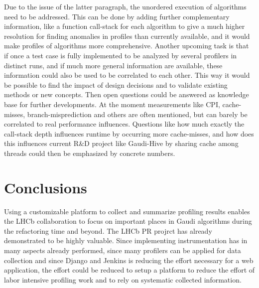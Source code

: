 \documentclass[a4paper]{jpconf}
\begin{document}
Due to the issue of the latter paragraph, the unordered execution of algorithms need to be addressed. This can be done by adding further complementary information, like a function call-stack for each algorithm to give a much higher resolution for finding anomalies in profiles than currently available, and it would make profiles of algorithms more comprehensive.
\newline
Another upcoming task is that if once a test case is fully implemented to be analyzed by several profilers in distinct runs, and if much more general information are available, these information could also be used to be correlated to each other. This way it would be possible to find the impact of design decisions and to validate existing methods or new concepts. Then open questions could be answered as knowledge base for further developments.
\newline
At the moment measurements like CPI, cache-misses, branch-misprediction and others are often mentioned, but can barely be correlated to real performance influences. Questions like how much exactly the call-stack depth influences runtime by occurring more cache-misses, and how does this influences current R\&D project like Gaudi-Hive by sharing cache among threads could then be emphasized by concrete numbers.

\section{Conclusions}
\label{sec:conclusions}

Using a customizable platform to collect and summarize profiling results enables the LHCb collaboration to focus on important places in Gaudi algorithms during the refactoring time and beyond. The LHCb PR projrct has already demonstrated to be highly valuable. Since implementing instrumentation has in many aspects already performed, since many profilers can be applied for data collection and since Django and Jenkins is reducing the effort necessary for a web application, the effort could be reduced to setup a platform to reduce the effort of labor intensive profiling work and to rely on systematic collected information. 
\end{document}
